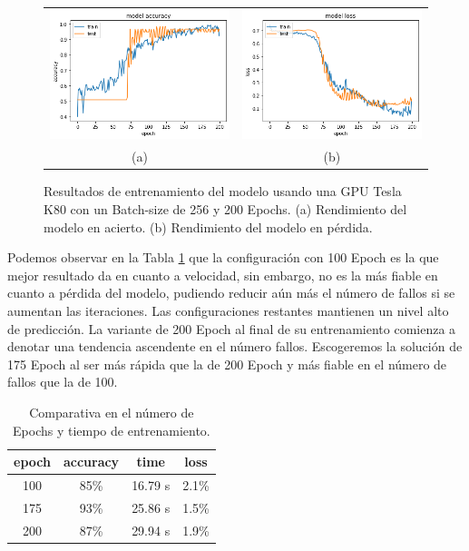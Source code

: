 \begin{figure}[H]
    \centering
    \begin{tabular}{cc}
        \includegraphics[height=0.35\textwidth]{images/chapter5/batch_256_200_epoch.png} &
        \includegraphics[height=0.35\textwidth]{images/chapter5/batch_256_200_epoch_loss.png}\\
        (a) & (b)\\
    \end{tabular}
    \caption{Resultados de entrenamiento del modelo usando una GPU Tesla K80 con un Batch-size de 256 y 200 Epochs. (a) Rendimiento del modelo en acierto. (b) Rendimiento del modelo en pérdida.}
    \label{fig:200-epochs}
\end{figure}

Podemos observar en la Tabla \ref{tab:Comparativa en el número de Epochs y tiempo de entrenamiento.} que la configuración con 100 Epoch es la que mejor resultado da en cuanto a velocidad, sin embargo, no es la más fiable en cuanto a pérdida del modelo, pudiendo reducir aún más el número de fallos si se aumentan las iteraciones.
Las configuraciones restantes mantienen un nivel alto de predicción. La variante de 200 Epoch al final de su entrenamiento comienza a denotar una tendencia ascendente en el número fallos.
Escogeremos la solución de 175 Epoch al ser más rápida que la de 200 Epoch y más fiable en el número de fallos que la de 100.

\begin{table}[ht]
    \begin{center}
        \begin{tabular}{| c | c | c | c |}
            \hline
            epoch & accuracy & time & loss \\ \hline
            100 & 85\% & 16.79 s & 2.1\% \\
            175 & 93\% & 25.86 s & 1.5\% \\
           200 & 87\% & 29.94 s &  1.9\% \\ \hline
        \end{tabular}
        \caption{Comparativa en el número de Epochs y tiempo de entrenamiento.}
        \label{tab:Comparativa en el número de Epochs y tiempo de entrenamiento.}
    \end{center}
\end{table}

